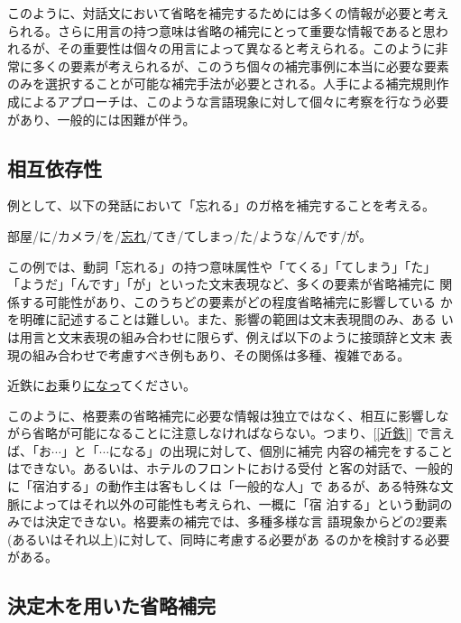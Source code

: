 このように、対話文において省略を補完するためには多くの情報が必要と考え
られる。さらに用言の持つ意味は省略の補完にとって重要な情報であると思わ
れるが、その重要性は個々の用言によって異なると考えられる。このように非
常に多くの要素が考えられるが、このうち個々の補完事例に本当に必要な要素
のみを選択することが可能な補完手法が必要とされる。人手による補完規則作
成によるアプローチは、このような言語現象に対して個々に考察を行なう必要
があり、一般的には困難が伴う。


\subsection{相互依存性}

例として、以下の発話において「忘れる」のガ格を補完することを考える。

\begin{example}
\item 部屋/に/カメラ/を/\underline{忘れ}/てき/てしまっ/た/ような/んです/が。
\end{example}

この例では、動詞「忘れる」の持つ意味属性や「てくる」「てしまう」「た」
「ようだ」「んです」「が」といった文末表現など、多くの要素が省略補完に
関係する可能性があり、このうちどの要素がどの程度省略補完に影響している
かを明確に記述することは難しい。また、影響の範囲は文末表現間のみ、ある
いは用言と文末表現の組み合わせに限らず、例えば以下のように接頭辞と文末
表現の組み合わせで考慮すべき例もあり、その関係は多種、複雑である。

\begin{example}
\item 近鉄に\underline{お}乗り\underline{になっ}てください。
\label{近鉄}
\end{example}

このように、格要素の省略補完に必要な情報は独立ではなく、相互に影響しな
がら省略が可能になることに注意しなければならない。つまり、[\ref{近鉄}]
で言えば、「お$\cdots$」と「$\cdots$になる」の出現に対して、個別に補完
内容の補完をすることはできない。あるいは、ホテルのフロントにおける受付
と客の対話で、一般的に「宿泊する」の動作主は客もしくは「一般的な人」で
あるが、ある特殊な文脈によってはそれ以外の可能性も考えられ、一概に「宿
泊する」という動詞のみでは決定できない。格要素の補完では、多種多様な言
語現象からどの2要素(あるいはそれ以上)に対して、同時に考慮する必要があ
るのかを検討する必要がある。



\subsection{決定木を用いた省略補完}

